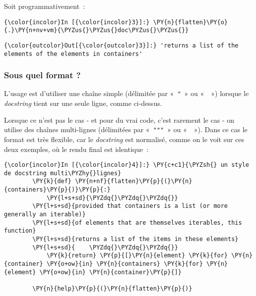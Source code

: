     Soit programmativement~:

    \begin{Verbatim}[commandchars=\\\{\},frame=single,framerule=0.3mm,rulecolor=\color{cellframecolor}]
{\color{incolor}In [{\color{incolor}3}]:} \PY{n}{flatten}\PY{o}{.}\PY{n+nv+vm}{\PYZus{}\PYZus{}doc\PYZus{}\PYZus{}}
\end{Verbatim}


\begin{Verbatim}[commandchars=\\\{\},frame=single,framerule=0.3mm,rulecolor=\color{cellframecolor}]
{\color{outcolor}Out[{\color{outcolor}3}]:} 'returns a list of the elements of the elements in containers'
\end{Verbatim}
            
    \hypertarget{sous-quel-format}{%
\subsubsection{Sous quel format ?}\label{sous-quel-format}}

    L'usage est d'utiliser une chaîne simple (délimitée par «~\texttt{"}~»
ou «~\texttt{\textquotesingle{}}~») lorsque le \emph{docstring} tient
sur une seule ligne, comme ci-dessus.

    Lorsque ce n'est pas le cas - et pour du vrai code, c'est rarement le
cas - on utilise des chaînes multi-lignes (délimitées par
«~\texttt{"""}~» ou
«~\texttt{\textquotesingle{}\textquotesingle{}\textquotesingle{}}~»).
Dans ce cas le format est très flexible, car le \emph{docstring} est
normalisé, comme on le voit sur ces deux exemples, où le rendu final est
identique~:

    \begin{Verbatim}[commandchars=\\\{\},frame=single,framerule=0.3mm,rulecolor=\color{cellframecolor}]
{\color{incolor}In [{\color{incolor}4}]:} \PY{c+c1}{\PYZsh{} un style de docstring multi\PYZhy{}lignes}
        \PY{k}{def} \PY{n+nf}{flatten}\PY{p}{(}\PY{n}{containers}\PY{p}{)}\PY{p}{:}
            \PY{l+s+sd}{\PYZdq{}\PYZdq{}\PYZdq{}}
        \PY{l+s+sd}{provided that containers is a list (or more generally an iterable)}
        \PY{l+s+sd}{of elements that are themselves iterables, this function}
        \PY{l+s+sd}{returns a list of the items in these elements}
        \PY{l+s+sd}{    \PYZdq{}\PYZdq{}\PYZdq{}}
            \PY{k}{return} \PY{p}{[}\PY{n}{element} \PY{k}{for} \PY{n}{container} \PY{o+ow}{in} \PY{n}{containers} \PY{k}{for} \PY{n}{element} \PY{o+ow}{in} \PY{n}{container}\PY{p}{]}
        
        \PY{n}{help}\PY{p}{(}\PY{n}{flatten}\PY{p}{)}
\end{Verbatim}


